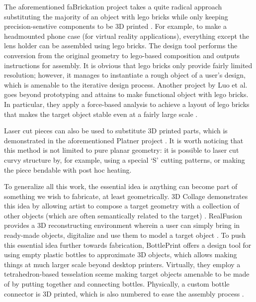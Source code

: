 The aforementioned faBrickation project takes a quite radical approach substituting the majority of an object with lego bricks while only keeping precision-senstive components to be 3D printed \cite{mueller2014fabrickation}. For example, to make a headmounted phone case (for virtual reality applications), everything except the lens holder can be assembled using lego bricks. The design tool performs the conversion from the original geometry to lego-based composition and outputs instructions for assembly. It is obvious that lego bricks only provide fairly limited resolution; however, it manages to instantiate a rough object of a user's design, which is amenable to the iterative design process. Another project by Luo et al. goes beyond prototyping and attains to make functional object with lego bricks. In particular, they apply a force-based analysis to achieve a layout of lego bricks that makes the target object stable even at a fairly large scale \cite{luo2015legolization}.

Laser cut pieces can also be used to substitute 3D printed parts, which is demonstrated in the aforementioned Platner project \cite{beyer2015platener}. It is worth noticing that this method is not limited to pure planar geometry: it is possible to laser cut curvy structure by, for example, using a special `S' cutting patterns, or making the piece bendable with post hoc heating.

To generalize all this work, the essential idea is anything can become part of something we wish to fabricate, at least geometrically. 3D Collage demonstrates this idea by allowing artist to compose a target geometry with a collection of other objects (which are often semantically related to the target) \cite{gal20073d}. RealFusion provides a 3D reconstructing environment wherein a user can simply bring in ready-made objects, digitalize and use them to model a target object \cite{piya2016}. To push this essential idea further towards fabrication, BottlePrint offers a design tool for using empty plastic bottles to approximate 3D objects, which allows making things at much larger scale beyond desktop printers. Virtually, they employ a tetrahedron-based tesselation sceme making target objects amenable to be made of by putting together and connecting bottles. Physically, a custom bottle connector is 3D printed, which is also numbered to ease the assembly process \cite{robertkovacs2016}.

